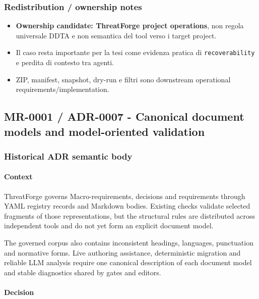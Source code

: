 \documentclass[
  10pt,
]{article}
\providecommand{\tightlist}{%
  \setlength{\itemsep}{0pt}\setlength{\parskip}{0pt}}
\begin{document}
\subsubsection{Redistribution / ownership
notes}\label{redistribution-ownership-notes-4}

\begin{itemize}
\tightlist
\item
  \textbf{Ownership candidate: ThreatForge project operations}, non
  regola universale DDTA e non semantica del tool verso i target
  project.
\item
  Il caso resta importante per la tesi come evidenza pratica di
  \texttt{recoverability} e perdita di contesto tra agenti.
\item
  ZIP, manifest, snapshot, dry-run e filtri sono downstream operational
  requirements/implementation.
\end{itemize}

\subsection{MR-0001 / ADR-0007 - Canonical document models and
model-oriented
validation}\label{mr-0001-adr-0007---canonical-document-models-and-model-oriented-validation}

\subsubsection{Historical ADR semantic
body}\label{historical-adr-semantic-body-5}

\paragraph{Context}\label{context-10}

ThreatForge governs Macro-requirements, decisions and requirements
through YAML registry records and Markdown bodies. Existing checks
validate selected fragments of those representations, but the structural
rules are distributed across independent tools and do not yet form an
explicit document model.

The governed corpus also contains inconsistent headings, languages,
punctuation and normative forms. Live authoring assistance,
deterministic migration and reliable LLM analysis require one canonical
description of each document model and stable diagnostics shared by
gates and editors.

\paragraph{Decision}\label{decision-10}
\end{document}
